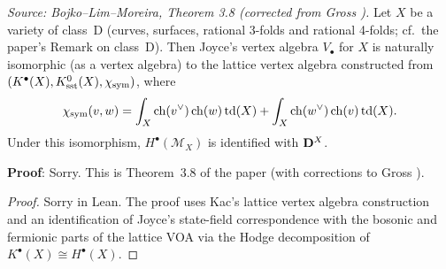 
\begin{theorem}[GrossIsomorphism]
  \label{thm:gross-iso}
  \textit{Source: Bojko--Lim--Moreira, Theorem 3.8 (corrected from Gross \cite{Gr19}).}
  Let \(X\) be a variety of class~D (curves, surfaces, rational 3-folds and rational
  4-folds; cf.\ the paper's Remark on class~D). Then Joyce's vertex algebra
  \(V_\bullet\) for \(X\) is naturally isomorphic (as a vertex algebra) to the lattice
  vertex algebra constructed from \((K^\bullet(X), K^0_{\mathrm{sst}}(X), \chi_\mathrm{sym})\),
  where
  \[\chi_\mathrm{sym}(v,w) = \int_X \mathrm{ch}(v^\vee)\, \mathrm{ch}(w)\, \mathrm{td}(X)
    + \int_X \mathrm{ch}(w^\vee)\, \mathrm{ch}(v)\, \mathrm{td}(X).\]
  Under this isomorphism, \(H^\bullet(\mathcal{M}_X)\) is identified with \(\mathbf{D}^X\).

  \textbf{Proof}: Sorry. This is Theorem~3.8 of the paper (with corrections to Gross \cite{Gr19}).
\end{theorem}

\begin{proof}
  Sorry in Lean. The proof uses Kac's lattice vertex algebra construction and an
  identification of Joyce's state-field correspondence with the bosonic and fermionic
  parts of the lattice VOA via the Hodge decomposition of \(K^\bullet(X) \cong H^\bullet(X)\).
\end{proof}

